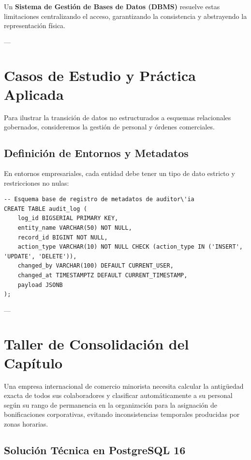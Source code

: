Un \textbf{Sistema de Gesti\'on de Bases de Datos (DBMS)} resuelve estas limitaciones centralizando el acceso, garantizando la consistencia y abstrayendo la representaci\'on f\'isica.

---

\section{Casos de Estudio y Pr\'actica Aplicada}

Para ilustrar la transici\'on de datos no estructurados a esquemas relacionales gobernados, consideremos la gesti\'on de personal y \'ordenes comerciales.

\subsection{Definici\'on de Entornos y Metadatos}
En entornos empresariales, cada entidad debe tener un tipo de dato estricto y restricciones no nulas:

\begin{lstlisting}[style=sqlstyle, caption={Definici\'on inicial de estructura de auditor\'ia}]
-- Esquema base de registro de metadatos de auditor\'ia
CREATE TABLE audit_log (
    log_id BIGSERIAL PRIMARY KEY,
    entity_name VARCHAR(50) NOT NULL,
    record_id BIGINT NOT NULL,
    action_type VARCHAR(10) NOT NULL CHECK (action_type IN ('INSERT', 'UPDATE', 'DELETE')),
    changed_by VARCHAR(100) DEFAULT CURRENT_USER,
    changed_at TIMESTAMPTZ DEFAULT CURRENT_TIMESTAMP,
    payload JSONB
);
\end{lstlisting}

---

\section{Taller de Consolidaci\'on del Cap\'itulo}

\begin{businessproblem}
Una empresa internacional de comercio minorista necesita calcular la antigüedad exacta de todos sus colaboradores y clasificar autom\'aticamente a su personal seg\'un su rango de permanencia en la organizaci\'on para la asignaci\'on de bonificaciones corporativas, evitando inconsistencias temporales producidas por zonas horarias.
\end{businessproblem}

\subsection{Soluci\'on T\'ecnica en PostgreSQL 16}


